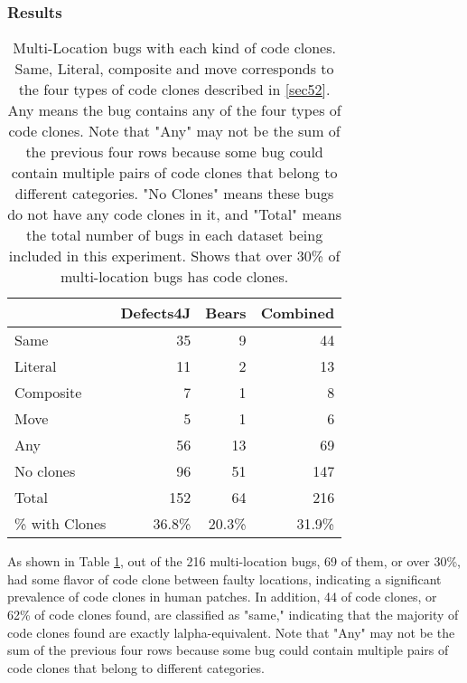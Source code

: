\documentclass[sigconf, timestamp-false, anonymous=true]{acmart}
\begin{document}
\subsubsection{Results}

\begin{table}
{\begin{center}
\begin{tabular} {lrrr}
\toprule
& Defects4J & Bears & Combined \\
\midrule
Same & 35 & 9 & 44  \\ 
Literal & 11 & 2 & 13  \\
Composite & 7 & 1 & 8  \\
Move & 5 & 1 & 6  \\
\midrule
Any & 56 & 13 & 69  \\
No clones & 96  &  51 & 147 \\
Total & 152 & 64 & 216 \\
\% with Clones & 36.8\% & 20.3\% & 31.9\% \\
\bottomrule
\end{tabular}
\end{center}
}
\caption{Multi-Location bugs with each kind of code clones. 
     Same, Literal, composite and move corresponds to the
    four types of code clones described in \ref{sec52}. Any means the bug
    contains any of the four types of code clones. Note that "Any" may not be
    the sum of the previous four rows because some bug could contain multiple
    pairs of code clones that belong to different categories. "No Clones" means
    these bugs do not have any code clones in it, and "Total" means the total
    number of bugs in each dataset being included in this experiment.
    Shows that over
    30\% of multi-location bugs has code clones.}
\label{tab:clones}
\end{table}

As shown in Table \ref{tab:clones}, out of the 216 multi-location bugs,
69 of them, or over 30\%, had some flavor of code clone between faulty locations, indicating a 
significant 
prevalence of code clones in human patches. In addition, 44 of code clones, or 62\% of code clones 
found, are classified as "same," indicating that the majority of code clones found are exactly 
lalpha-equivalent. Note that "Any" may not
be the sum of the previous four rows because some bug could contain multiple pairs of code clones 
that
belong to different categories.
\end{document}
